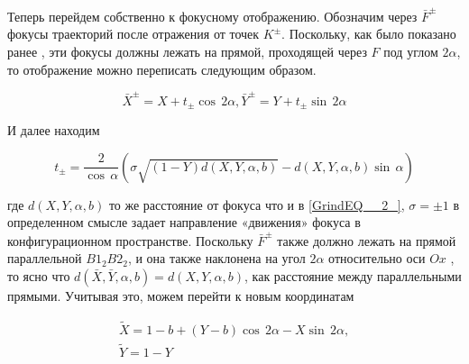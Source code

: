 \documentclass[a4paper]{article}
\begin{document}
%
%
%

Теперь перейдем собственно к фокусному отображению. Обозначим через $\bar{F}^{\pm } $ фокусы траекторий после отражения от точек $K^{\pm } $. Поскольку, как было показано ранее \cite{Yanovskii2013}, эти фокусы должны лежать на прямой, проходящей через $F$ под углом $2\alpha $, то отображение можно переписать следующим образом.

\begin{equation} \label{GrindEQ__6_} \bar{X}^{\pm } =X+t_{\pm } \cos \, 2\alpha ,  \bar{Y}^{\pm } =Y+t_{\pm } \sin \, 2\alpha  \end{equation}

И далее находим

\begin{equation} \label{GrindEQ__7_}t_{\pm } =\frac{2}{\cos \, \alpha } \left(\sigma \sqrt{\left(1-Y\right)d\left(X,Y,\alpha ,b\right)} -d\left(X,Y,\alpha ,b\right)\sin \, \alpha \right) \end{equation}

где $d\left(X,Y,\alpha ,b\right)$ то же расстояние от фокуса что и в \eqref{GrindEQ__2_}, $\sigma =\pm 1$ в определенном смысле задает направление «движения» фокуса в конфигурационном пространстве. Поскольку $\bar{F}^{\pm } $ также должно лежать на прямой параллельной $B1_{2} B2_{2} $, и она также наклонена на угол $2\alpha$ относительно оси $Ox$ , то ясно что $d\left(\bar{X},\bar{Y},\alpha ,b\right)=d\left(X,Y,\alpha ,b\right)$, как расстояние между параллельными прямыми. Учитывая это, можем перейти к новым координатам

\begin{equation} \label{GrindEQ__8_} \begin{array}{l} {\tilde{X}=1-b+\left(Y-b\right)\cos \, 2\alpha -X\sin \, 2\alpha ,} \\ {\tilde{Y}=1-Y} \end{array} \end{equation}
\end{document}

